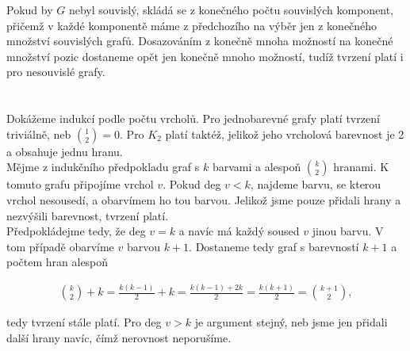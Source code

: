 \documentclass{scrartcl}
\begin{document}
    Pokud by $G$ nebyl souvislý, skládá se z konečného počtu souvislých komponent, přičemž v každé komponentě máme z předchozího na výběr jen z konečného množství souvislých grafů. Dosazováním z konečně mnoha možností na konečné množství pozic dostaneme opět jen konečně mnoho možností, tudíž tvrzení platí i pro nesouvislé grafy.

    \section{}
    Dokážeme indukcí podle počtu vrcholů. Pro jednobarevné grafy platí tvrzení triviálně, neb $\binom{1}{2} = 0$. Pro $K_2$ platí taktéž, jelikož jeho vrcholová barevnost je 2 a obsahuje jednu hranu. \\

    Mějme z indukčního předpokladu graf s $k$ barvami a alespoň $\binom{k}{2}$ hranami. K tomuto grafu připojíme vrchol $v$. Pokud deg $v < k$, najdeme barvu, se kterou vrchol nesousedí, a obarvímem ho tou barvou. Jelikož jsme pouze přidali hrany a nezvýšili barevnost, tvrzení platí. \\

    Předpokládejme tedy, že deg $v = k$ a navíc má každý soused $v$ jinou barvu. V tom případě obarvíme $v$ barvou $k+1$. Dostaneme tedy graf s barevností $k+1$ a počtem hran alespoň

    \begin{align*}
        \binom{k}{2} + k = \frac{k(k-1)}{2} + k = \frac{k(k-1) + 2k}{2} = \frac{k(k+1)}{2} = \binom{k+1}{2},
    \end{align*}

    tedy tvrzení stále platí. Pro deg $v > k$ je argument stejný, neb jsme jen přidali další hrany navíc, čímž nerovnost neporušíme.
    
\end{document}
